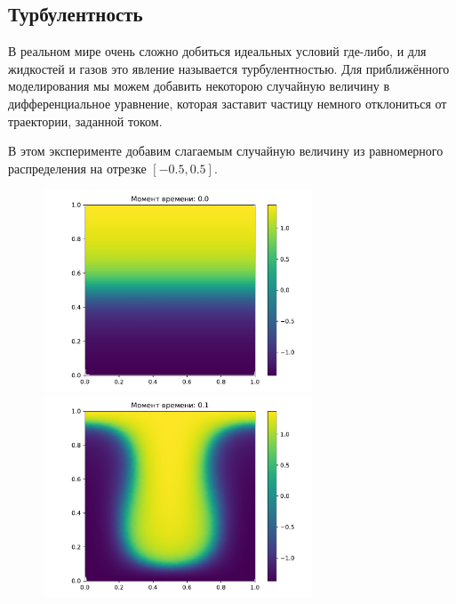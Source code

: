     \subsection{Турбулентность}
        В реальном мире очень сложно добиться идеальных условий где-либо, и для жидкостей и газов это явление называется турбулентностью. Для приближённого моделирования мы можем добавить некоторою случайную величину в дифференциальное уравнение, которая заставит частицу немного отклониться от траектории, заданной током.
        
        В этом эксперименте добавим слагаемым случайную величину из равномерного распределения на отрезке \( [-0.5, 0.5] \). 
    
        \begin{figure}[H]
            \centering
            \includegraphics[width=8cm]{pictures/pr0.pdf}
            \includegraphics[width=8cm]{pictures/pr5.pdf}
        \end{figure}
